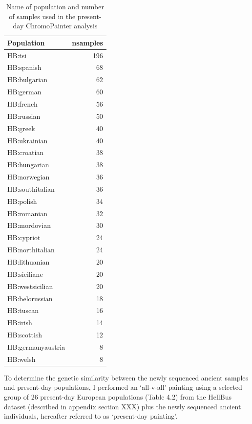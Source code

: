 \begin{table}
\small
\begin{tabular}{l|r}
\hline
Population & nsamples\\
\hline
HB:tsi & 196\\
\hline
HB:spanish & 68\\
\hline
HB:bulgarian & 62\\
\hline
HB:german & 60\\
\hline
HB:french & 56\\
\hline
HB:russian & 50\\
\hline
HB:greek & 40\\
\hline
HB:ukrainian & 40\\
\hline
HB:croatian & 38\\
\hline
HB:hungarian & 38\\
\hline
HB:norwegian & 36\\
\hline
HB:southitalian & 36\\
\hline
HB:polish & 34\\
\hline
HB:romanian & 32\\
\hline
HB:mordovian & 30\\
\hline
HB:cypriot & 24\\
\hline
HB:northitalian & 24\\
\hline
HB:lithuanian & 20\\
\hline
HB:siciliane & 20\\
\hline
HB:westsicilian & 20\\
\hline
HB:belorussian & 18\\
\hline
HB:tuscan & 16\\
\hline
HB:irish & 14\\
\hline
HB:scottish & 12\\
\hline
HB:germanyaustria & 8\\
\hline
HB:welsh & 8\\
\hline
\end{tabular}
\caption{Name of population and number of samples used in the present-day ChromoPainter analysis}
\end{table}

To determine the genetic similarity between the newly sequenced ancient samples and present-day populations, I performed an `all-v-all' painting using a selected group of 26 present-day European populations (Table 4.2) from the HellBus dataset (described in appendix section XXX) plus the newly sequenced ancient individuals, hereafter referred to as `present-day painting'.

